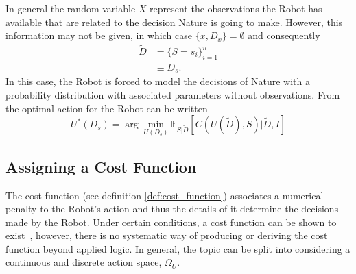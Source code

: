 \begin{example}
	In general the random variable $X$ represent the observations the Robot has available that are related to the decision Nature is going to make. However, this information may not be given, in which case $\{x,D_x\}=\emptyset$ and consequently
	\begin{equation}
		\begin{split}
			\tilde{D} &=\{S= s_i\}_{i=1}^n\\
			&\equiv D_s.
		\end{split}
	\end{equation}
	In this case, the Robot is forced to model the decisions of Nature with a probability distribution with associated parameters without observations. From  the optimal action for the Robot can be written
	\begin{equation}
		U^*(D_s) = \arg\min_{U(D_s)} \mathbb{E}_{S|\tilde{D}}[C(U(\tilde{D}), S)|\tilde{D},I]
		\label{eq:best_decision1}
	\end{equation}
\end{example}

\subsection{Assigning a Cost Function}
\label{sec:assing_cost}
The cost function (see definition \ref{def:cost_function}) associates a numerical penalty to the Robot's action and thus the details of it determine the decisions made by the Robot. Under certain conditions, a cost function can be shown to exist~\citep{lavalle2006planning}, however, there is no systematic way of producing or deriving the cost function beyond applied logic. In general, the topic can be split into considering a continuous and discrete action space, $\Omega_U$. 	


